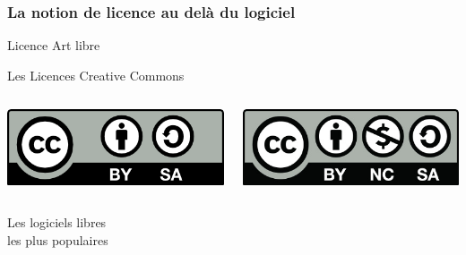 \documentclass{beamer}
\begin{document}
\begin{frame}
\frametitle{La notion de licence au delà du logiciel}
\begin{block}{Licence Art libre}
\end{block}

\begin{block}{Les Licences Creative Commons}
\begin{columns}[c] 
\begin{center}
 \includegraphics[scale=1] {./images/CC-by-sa.png}
\end{center}
\begin{center}
 \includegraphics[scale=1] {./images/CC-by-nc-sa.jpg} 
\end{center}
\end{columns}
 \end{block}
\end{frame}

\begin{frame}
\begin{center}
\Huge{Les logiciels libres \\les plus populaires}
\end{center}
\end{frame}
\end{document}
